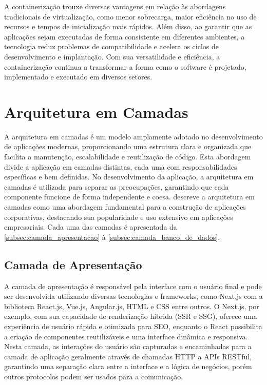 A containerização trouxe diversas vantagens em relação às abordagens tradicionais de virtualização, como menor sobrecarga, maior eficiência no uso de recursos e tempos de inicialização mais rápidos. Além disso, ao garantir que as aplicações sejam executadas de forma consistente em diferentes ambientes, a tecnologia reduz problemas de compatibilidade e acelera os ciclos de desenvolvimento e implantação. Com sua versatilidade e eficiência, a containerização continua a transformar a forma como o software é projetado, implementado e executado em diversos setores.

\section{Arquitetura em Camadas}

A arquitetura em camadas é um modelo amplamente adotado no desenvolvimento de aplicações modernas, proporcionando uma estrutura clara e organizada que facilita a manutenção, escalabilidade e reutilização de código. Esta abordagem divide a aplicação em camadas distintas, cada uma com responsabilidades específicas e bem definidas. No desenvolvimento da aplicação, a arquitetura em camadas é utilizada para separar as preocupações, garantindo que cada componente funcione de forma independente e coesa. \cite{Fowler02} descreve a arquitetura em camadas como uma abordagem fundamental para a construção de aplicações corporativas, destacando sua popularidade e uso extensivo em aplicações empresariais. Cada uma das camadas é apresentada da \autoref{subsec:camada_apresentacao} à \autoref{subsec:camada_banco_de_dados}.

\subsection{Camada de Apresentação}\label{subsec:camada_apresentacao}

A camada de apresentação é responsável pela interface com o usuário final e pode ser desenvolvida utilizando diversas tecnologias e frameworks, como Next.js com a biblioteca React.js, Vue.js, Angular.js, HTML e CSS entre outros. O Next.js, por exemplo, com sua capacidade de renderização híbrida (SSR e SSG), oferece uma experiência de usuário rápida e otimizada para SEO, enquanto o React possibilita a criação de componentes reutilizáveis e uma interface dinâmica e responsiva. Nesta camada, as interações do usuário são capturadas e encaminhadas para a camada de aplicação geralmente através de chamadas HTTP a APIs RESTful, garantindo uma separação clara entre a interface e a lógica de negócios, porém outros protocolos podem ser usados para a comunicação.

